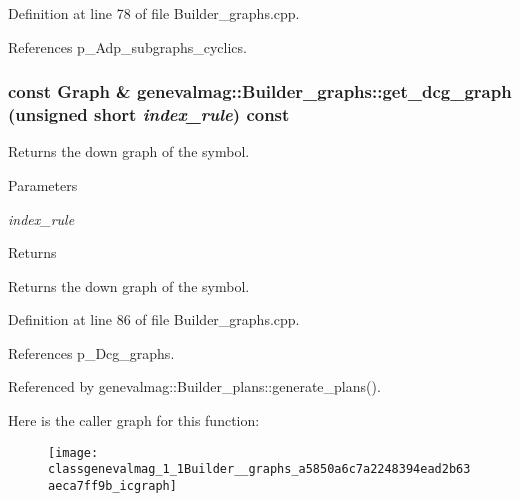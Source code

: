 Definition at line 78 of file Builder\_\-graphs.cpp.



References p\_\-Adp\_\-subgraphs\_\-cyclics.

\hypertarget{classgenevalmag_1_1Builder__graphs_a5850a6c7a2248394ead2b63aeca7ff9b}{
\subsubsection[{get\_\-dcg\_\-graph}]{\setlength{\rightskip}{0pt plus 5cm}const {\bf Graph} \& genevalmag::Builder\_\-graphs::get\_\-dcg\_\-graph (unsigned short {\em index\_\-rule}) const}}
\label{classgenevalmag_1_1Builder__graphs_a5850a6c7a2248394ead2b63aeca7ff9b}
Returns the down graph of the symbol. 
\begin{DoxyParams}{Parameters}
\item[{\em index\_\-rule}]\end{DoxyParams}
\begin{DoxyReturn}{Returns}

\end{DoxyReturn}
Returns the down graph of the symbol. 

Definition at line 86 of file Builder\_\-graphs.cpp.



References p\_\-Dcg\_\-graphs.



Referenced by genevalmag::Builder\_\-plans::generate\_\-plans().



Here is the caller graph for this function:\nopagebreak
\begin{figure}[H]
\begin{center}
\leavevmode
\texttt{[image: classgenevalmag\_1\_1Builder\_\_graphs\_a5850a6c7a2248394ead2b63aeca7ff9b\_icgraph]}
\end{center}
\end{figure}


